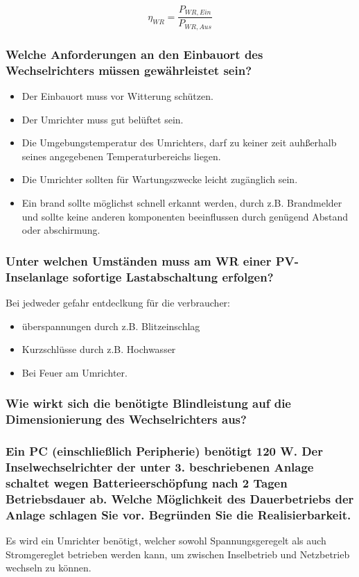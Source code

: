 \begin{equation}
    \eta_{WR} = \frac{P_{WR,Ein}}{P_{WR,Aus}}
    \label{eq:230430_WR-Wirkungsgrad}
\end{equation}

\subsubsection{Welche Anforderungen an den Einbauort des Wechselrichters müssen gewährleistet sein?}
\begin{itemize}
    \item Der Einbauort muss vor Witterung schützen.
    \item Der Umrichter muss gut belüftet sein.
    \item Die Umgebungstemperatur des Umrichters, darf zu keiner zeit auhßerhalb seines angegebenen Temperaturbereichs liegen.
    \item Die Umrichter sollten für Wartungszwecke leicht zugänglich sein.
    \item Ein brand sollte möglichst schnell erkannt werden, durch z.B. Brandmelder und sollte keine anderen komponenten beeinflussen durch genügend Abstand oder abschirmung.
\end{itemize}
\subsubsection{Unter welchen Umständen muss am WR einer PV-Inselanlage sofortige Lastabschaltung erfolgen?}
Bei jedweder gefahr entdeclkung für die verbraucher:
\begin{itemize}
    \item überspannungen durch z.B. Blitzeinschlag
    \item Kurzschlüsse durch z.B. Hochwasser
    \item Bei Feuer am Umrichter.
\end{itemize}
\subsubsection{Wie wirkt sich die benötigte Blindleistung auf die Dimensionierung des Wechselrichters aus?}
\subsubsection{Ein PC (einschließlich Peripherie) benötigt 120 W. Der Inselwechselrichter der unter 3. beschriebenen Anlage schaltet wegen Batterieerschöpfung nach 2 Tagen Betriebsdauer ab. Welche Möglichkeit des Dauerbetriebs der Anlage schlagen Sie vor. Begründen Sie die Realisierbarkeit.}
Es wird ein Umrichter benötigt, welcher sowohl Spannungsgeregelt als auch Stromgereglet betrieben werden kann, um zwischen Inselbetrieb und Netzbetrieb wechseln zu können.
